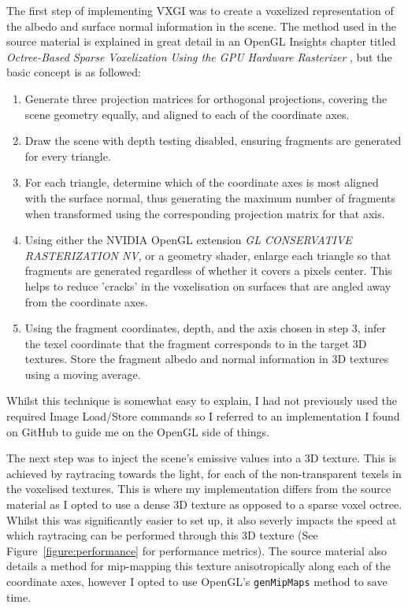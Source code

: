 \documentclass[]{acmsiggraph}
\begin{document}
The first step of implementing VXGI was to create a voxelized representation of the albedo and surface normal information in the scene. The method used in the source material \cite{crassinneyretsainzgreeneisemann2011} is explained in great detail in an OpenGL Insights chapter titled \textit{Octree-Based Sparse Voxelization Using the GPU Hardware Rasterizer} \cite{crassingreen2012}, but the basic concept is as followed:
\begin{enumerate}
	\item Generate three projection matrices for orthogonal projections, covering the scene geometry equally, and aligned to each of the coordinate axes.
	\item Draw the scene with depth testing disabled, ensuring fragments are generated for every triangle.
	\item For each triangle, determine which of the coordinate axes is most aligned with the surface normal, thus generating the maximum number of fragments when transformed using the corresponding projection matrix for that axis.
	\item Using either the NVIDIA OpenGL extension \textit{GL CONSERVATIVE RASTERIZATION NV}, or a geometry shader, enlarge each triangle so that fragments are generated regardless of whether it covers a pixels center. This helps to reduce 'cracks' in the voxelisation on surfaces that are angled away from the coordinate axes.
	\item Using the fragment coordinates, depth, and the axis chosen in step 3, infer the texel coordinate that the fragment corresponds to in the target 3D textures. Store the fragment albedo and normal information in 3D textures using a moving average.
\end{enumerate}
Whilst this technique is somewhat easy to explain, I had not previously used the required Image Load/Store commands so I referred to an implementation I found on GitHub \cite{voxelization} to guide me on the OpenGL side of things.

The next step was to inject the scene's emissive values into a 3D texture. This is achieved by raytracing towards the light, for each of the non-transparent texels in the voxelised textures. This is where my implementation differs from the source material \cite{crassinneyretsainzgreeneisemann2011} as I opted to use a dense 3D texture as opposed to a sparse voxel octree. Whilst this was significantly easier to set up, it also severly impacts the speed at which raytracing can be performed through this 3D texture (See Figure~\ref{figure:performance} for performance metrics). The source material \cite{crassinneyretsainzgreeneisemann2011} also details a method for mip-mapping this texture anisotropically along each of the coordinate axes, however I opted to use OpenGL's \lstinline{genMipMaps} method to save time.
\end{document}
